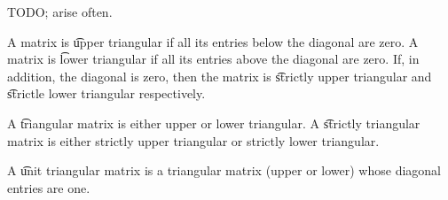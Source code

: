 
\sbasic



























\sstart
{}


TODO;
arise often.


A matrix is \t{upper triangular} if all its entries below the diagonal are zero.
A matrix is \t{lower triangular} if all its entries above the diagonal are zero.
If, in addition, the diagonal is zero, then the matrix is \t{strictly upper triangular} and \t{strictle lower triangular} respectively.

A \t{triangular} matrix is either upper or lower triangular.
A \t{strictly triangular} matrix is either strictly upper triangular or strictly lower triangular.

A \t{unit triangular matrix} is a triangular matrix (upper or lower) whose diagonal entries are one.
\strats
